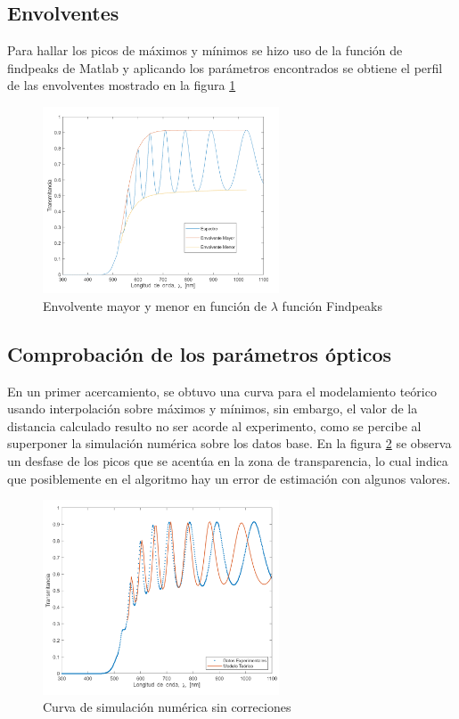 \documentclass[article]{article}
\begin{document}
\begin{multicols}{2}
    \subsection{Envolventes}
        
        Para hallar los picos de máximos y mínimos se hizo uso de la función de findpeaks de Matlab y aplicando los parámetros encontrados se obtiene el perfil de las envolventes mostrado en la figura \ref{fig:envolventes-matlab}

        \begin{figure}[H]
        \centering
        \includegraphics[width=7cm]{envolventesMym.png}
        \caption{Envolvente mayor y menor en función de $\lambda$   función Findpeaks}
        \label{fig:envolventes-matlab}
        \end{figure}
        
    \subsection{Comprobación de los parámetros ópticos}   
    
        En un primer acercamiento, se obtuvo una curva para el modelamiento teórico usando interpolación sobre máximos y mínimos, sin embargo, el valor de la distancia calculado resulto no ser acorde al experimento, como se percibe al superponer  la simulación numérica sobre los datos base. En la figura \ref{fig:ajuste-sin-correcciones} se observa un  desfase de los picos que se acentúa en la zona de transparencia, lo cual indica que posiblemente en el algoritmo hay un error de estimación con algunos valores. 
        \begin{figure}[H]
            \centering \includegraphics[width= 7cm]{ajuste.png}
            \caption{Curva de simulación numérica sin correciones} \label{fig:ajuste-sin-correcciones}
        \end{figure}
        

\end{multicols}
\end{document}
